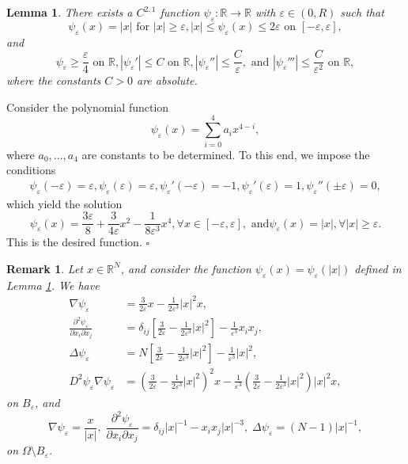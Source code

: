 \documentclass[11pt]{article}
\newcommand{\R}{{\mathbb R}}
\newtheorem{remark}{Remark}[section]
\newtheorem{lemma}{Lemma}[section]
\newenvironment{proof}{{\bf {Proof.}}}{\hfill $\square$}
\numberwithin{equation}{section}
\def\pt{\partial}
\def\e{\varepsilon}
\def\bf{\textbf}
\def\pt{\partial}
\def\Om{\Omega}
\def\de{\delta}
\def\De{\Delta}
\begin{document}
 \begin{lemma}\label{12.17.L1}
There exists a $C^{2,1}$ function $\psi_\e: \R \to \R$ with $\e \in (0,R)$ such that
\begin{equation*}
\psi_\e(x) = |x| \text{  for } |x| \geq \e,   |x| \leq \psi_\e(x) \leq 2\e \text{  on } [-\e, \e],
\end{equation*}
and
\begin{equation}\label{12.16.1}
\psi_\e \geq \frac{\e}{4} \text{  on } \R,   |\psi_\e'| \leq C \text{  on } \R,   |\psi_\e''| \leq \frac{C}{\e}, \text{  and } |\psi_\e'''| \leq \frac{C}{\e^2} \text{  on } \R,
\end{equation}
where the constants $C > 0$ are absolute.
\end{lemma}
\begin{proof}
Consider the polynomial function
\begin{equation*}
\psi_\e(x) = \sum_{i=0}^4 a_i x^{4-i},
\end{equation*}
where $a_0, \ldots, a_4$ are constants to be determined. To this end, we impose the conditions
\begin{equation*}
\begin{split}
\psi_\e(-\e) = \e,   \psi_\e(\e) = \e,   \psi_\e'(-\e) = -1,   \psi_\e'(\e) = 1,   \psi_\e''(\pm \e) = 0,
\end{split}
\end{equation*}
which yield the solution
\begin{equation}\label{12.20.1}
\psi_\e(x) = \frac{3\e}{8} + \frac{3}{4\e}x^2 - \frac{1}{8\e^3}x^4,   \forall x \in [-\e,\e],   \text{ and}   \psi_\e(x) = |x|,   \forall |x| \geq \e.
\end{equation}
This is the desired function.
\end{proof}
\begin{remark}
Let $x \in \R^N$, and consider the function $\psi_\e(x) = \psi_\e(|x|)$ defined in Lemma \ref{12.17.L1}. We have
\begin{equation}\label{12.18.1}
\begin{split}
\nabla\psi_\e &= \frac{3}{2\e}x - \frac{1}{2\e^3}|x|^2x, \\
\frac{\pt^2 \psi_\e}{\pt x_i \pt x_j} &= \de_{ij}\left[\frac{3}{2\e} - \frac{1}{2\e^3}|x|^2\right] - \frac{1}{\e^3}x_ix_j, \\
\De\psi_\e &= N\left[\frac{3}{2\e} - \frac{1}{2\e^3}|x|^2\right] - \frac{1}{\e^3}|x|^2, \\
D^2\psi_\e\nabla\psi_\e &= \left(\frac{3}{2\e} - \frac{1}{2\e^3}|x|^2\right)^2x - \frac{1}{\e^3}\left(\frac{3}{2\e} - \frac{1}{2\e^3}|x|^2\right)|x|^2x,
\end{split}
\end{equation}
on $B_\e$, and
\begin{equation}\label{12.18.2}
\nabla \psi_\e = \frac{x}{|x|}, \;
\frac{\pt^2\psi_\e}{\pt x_i \pt x_j} = \de_{ij}|x|^{-1} - x_ix_j|x|^{-3},\;
\De\psi_\e = (N-1)|x|^{-1},
\end{equation}
on $\Om \setminus B_\e$.
\end{remark}
\end{document}
